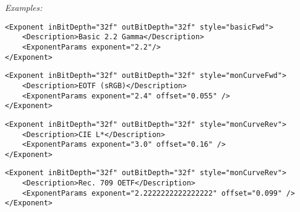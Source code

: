 \emph{Examples:}
\begin{lstlisting}[caption=Using \xml{Exponent} node for applying a 2.2 gamma.]
<Exponent inBitDepth="32f" outBitDepth="32f" style="basicFwd">
    <Description>Basic 2.2 Gamma</Description>
    <ExponentParams exponent="2.2"/>
</Exponent>
\end{lstlisting}

\begin{lstlisting}[caption=Using \xml{Exponent} node for applying the intended EOTF found in IEC 61966-2-1:1999 (sRGB).]
<Exponent inBitDepth="32f" outBitDepth="32f" style="monCurveFwd">
    <Description>EOTF (sRGB)</Description>
    <ExponentParams exponent="2.4" offset="0.055" />
</Exponent>
\end{lstlisting}

\begin{lstlisting}[caption=Using \xml{Exponent} node to apply CIE L* formula.]
<Exponent inBitDepth="32f" outBitDepth="32f" style="monCurveRev">
    <Description>CIE L*</Description>
    <ExponentParams exponent="3.0" offset="0.16" />
</Exponent>
\end{lstlisting}

\begin{lstlisting}[caption=Using \xml{Exponent} node to apply Rec. 709 OETF.]
<Exponent inBitDepth="32f" outBitDepth="32f" style="monCurveRev">
    <Description>Rec. 709 OETF</Description>
    <ExponentParams exponent="2.2222222222222222" offset="0.099" />
</Exponent>
\end{lstlisting}